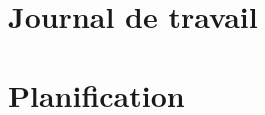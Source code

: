 \documentclass[11pt,a4paper,oldfontcommands]{memoir}
\begin{document}

\chapter{Journal de travail}


\chapter{Planification}
\end{document}

